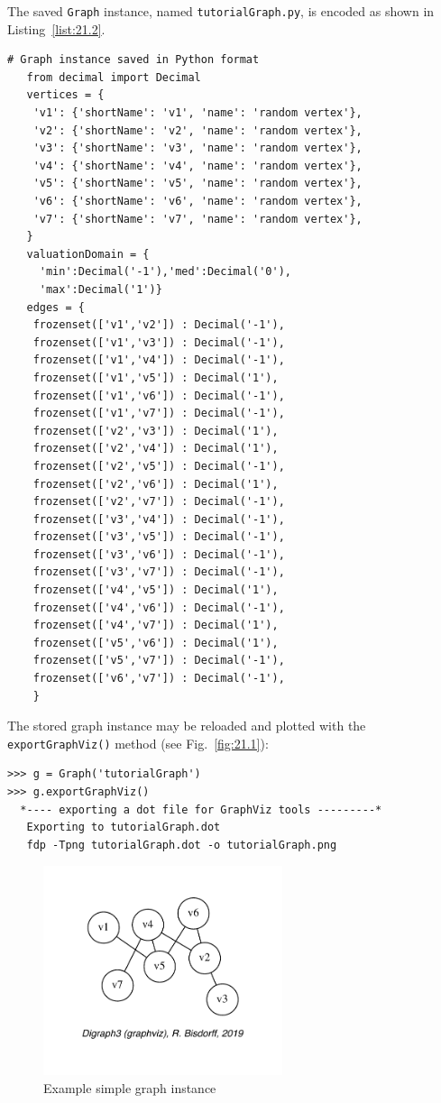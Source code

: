 The saved \texttt{Graph} instance, named \texttt{tutorialGraph.py}, is encoded as shown in Listing~\vref{list:21.2}.
\begin{lstlisting}[caption={Stored instance of a random graph},label=list:21.2]
  # Graph instance saved in Python format
   from decimal import Decimal
   vertices = {
    'v1': {'shortName': 'v1', 'name': 'random vertex'},
    'v2': {'shortName': 'v2', 'name': 'random vertex'},
    'v3': {'shortName': 'v3', 'name': 'random vertex'},
    'v4': {'shortName': 'v4', 'name': 'random vertex'},
    'v5': {'shortName': 'v5', 'name': 'random vertex'},
    'v6': {'shortName': 'v6', 'name': 'random vertex'},
    'v7': {'shortName': 'v7', 'name': 'random vertex'},
   }
   valuationDomain = {
     'min':Decimal('-1'),'med':Decimal('0'),
     'max':Decimal('1')}
   edges = {
    frozenset(['v1','v2']) : Decimal('-1'), 
    frozenset(['v1','v3']) : Decimal('-1'), 
    frozenset(['v1','v4']) : Decimal('-1'), 
    frozenset(['v1','v5']) : Decimal('1'), 
    frozenset(['v1','v6']) : Decimal('-1'), 
    frozenset(['v1','v7']) : Decimal('-1'), 
    frozenset(['v2','v3']) : Decimal('1'), 
    frozenset(['v2','v4']) : Decimal('1'), 
    frozenset(['v2','v5']) : Decimal('-1'), 
    frozenset(['v2','v6']) : Decimal('1'), 
    frozenset(['v2','v7']) : Decimal('-1'), 
    frozenset(['v3','v4']) : Decimal('-1'), 
    frozenset(['v3','v5']) : Decimal('-1'), 
    frozenset(['v3','v6']) : Decimal('-1'), 
    frozenset(['v3','v7']) : Decimal('-1'), 
    frozenset(['v4','v5']) : Decimal('1'), 
    frozenset(['v4','v6']) : Decimal('-1'), 
    frozenset(['v4','v7']) : Decimal('1'), 
    frozenset(['v5','v6']) : Decimal('1'), 
    frozenset(['v5','v7']) : Decimal('-1'), 
    frozenset(['v6','v7']) : Decimal('-1'), 
    }
\end{lstlisting}

The stored graph instance may be reloaded and plotted with the \texttt{export\-GraphViz()} method (see Fig.~\vref{fig:21.1}):
\begin{lstlisting}
>>> g = Graph('tutorialGraph')
>>> g.exportGraphViz()
  *---- exporting a dot file for GraphViz tools ---------*
   Exporting to tutorialGraph.dot
   fdp -Tpng tutorialGraph.dot -o tutorialGraph.png
\end{lstlisting}
\begin{figure}[h]
\sidecaption[t]
\includegraphics[width=7cm]{Figures/21-1-tutorialGraph.pdf}
\caption{Example simple graph instance} 
\label{fig:21.1}       %
\end{figure}

